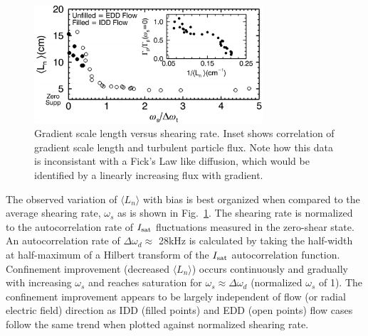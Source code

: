 \documentclass[aps,prl,amsmath,amssymb,preprint,superscriptaddress]{revtex4}
\begin{document}
\begin{figure}[!htbp]
\centerline{
\includegraphics[width=8.5cm]{shearandgrad.pdf}}
\caption{\label{fig:shearandgrad} Gradient scale length versus shearing rate. Inset shows correlation of gradient scale length and turbulent particle flux. Note how this data is inconsistant with a Fick's Law like diffusion, which would be identified by a linearly increasing flux with gradient.}
\end{figure}



The observed variation of $\langle L_{n} \rangle$ with bias is best organized when compared to the average shearing rate, $\omega_s$ as is shown in Fig.~\ref{fig:shearandgrad}.   The shearing rate is normalized to the autocorrelation rate of $I_{\rm sat}$ fluctuations measured in the zero-shear state.  An autocorrelation rate of $\Delta \omega_{d} \approx $ 28kHz is calculated by taking the half-width at half-maximum of a Hilbert transform of the $I_{\rm sat}$ autocorrelation function.  Confinement improvement (decreased $\langle L_n \rangle$) occurs continuously and gradually with increasing $\omega_{s}$ and reaches saturation for $\omega_{s} \approx \Delta \omega_{d}$ (normalized $\omega_s$ of 1).  The confinement improvement appears to be largely independent of flow (or radial electric field) direction as IDD (filled points) and EDD (open points) flow cases follow the same trend when plotted against normalized shearing rate.
\end{document}
